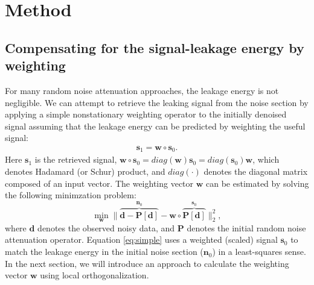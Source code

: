 \section{Method}
\subsection{Compensating for the signal-leakage energy by weighting}

For many random noise attenuation approaches, the leakage energy is not negligible. We can attempt to retrieve the leaking signal from the noise section by applying a simple nonstationary weighting operator to the initially denoised signal assuming that the leakage energy can be predicted by weighting the useful signal:
\begin{align}
\label{eq:retr1}
\mathbf{s}_1=\mathbf{w}\circ \mathbf{s}_0.
\end{align}
Here $\mathbf{s}_1$ is the retrieved signal, $\mathbf{w}\circ\mathbf{s}_0=diag(\mathbf{w})\mathbf{s}_0=diag(\mathbf{s}_0)\mathbf{w}$, which denotes Hadamard (or Schur) product, and $diag(\cdot)$ denotes the diagonal matrix composed of an input vector. The weighting vector $\mathbf{w}$ can be estimated by solving the following minimzation problem:
\begin{equation}
\label{eq:simple}
\min_{\mathbf{w}} \parallel \overbrace{\mathbf{d} - \mathbf{P}[\mathbf{d}]}^{\mathbf{n}_0} - \mathbf{w}\circ \overbrace{\mathbf{P}[\mathbf{d}]}^{\mathbf{s}_0} \parallel_2^2,
\end{equation}
where $\mathbf{d}$ denotes the observed noisy data, and $\mathbf{P}$ denotes the initial random noise attenuation operator. %
Equation \ref{eq:simple} uses a weighted (scaled) signal $\mathbf{s}_0$ to match the leakage energy in the initial noise section ($\mathbf{n}_0$) in a least-squares sense. %
In the next section, we will introduce an approach to calculate the weighting vector $\mathbf{w}$ using local orthogonalization. 

